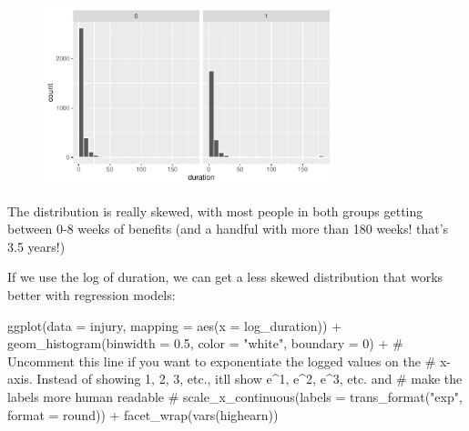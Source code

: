 \documentclass[
  letterpaper,
  DIV=11,
  numbers=noendperiod]{scrartcl}
\newenvironment{Shaded}{\begin{snugshade}}{\end{snugshade}}
\newcommand{\AttributeTok}[1]{\textcolor[rgb]{0.40,0.45,0.13}{#1}}
\newcommand{\CommentTok}[1]{\textcolor[rgb]{0.37,0.37,0.37}{#1}}
\newcommand{\DecValTok}[1]{\textcolor[rgb]{0.68,0.00,0.00}{#1}}
\newcommand{\FloatTok}[1]{\textcolor[rgb]{0.68,0.00,0.00}{#1}}
\newcommand{\FunctionTok}[1]{\textcolor[rgb]{0.28,0.35,0.67}{#1}}
\newcommand{\NormalTok}[1]{\textcolor[rgb]{0.00,0.23,0.31}{#1}}
\newcommand{\SpecialCharTok}[1]{\textcolor[rgb]{0.37,0.37,0.37}{#1}}
\newcommand{\StringTok}[1]{\textcolor[rgb]{0.13,0.47,0.30}{#1}}
\begin{document}
\begin{figure}[H]

{\centering \includegraphics[width=0.75\textwidth,height=\textheight]{DD_wooldridge_injury_files/figure-pdf/duration-histogram-1.pdf}

}

\end{figure}

The distribution is really skewed, with most people in both groups
getting between 0-8 weeks of benefits (and a handful with more than 180
weeks! that's 3.5 years!)

If we use the log of duration, we can get a less skewed distribution
that works better with regression models:

\begin{Shaded}
\begin{Highlighting}[]
\FunctionTok{ggplot}\NormalTok{(}\AttributeTok{data =}\NormalTok{ injury, }\AttributeTok{mapping =} \FunctionTok{aes}\NormalTok{(}\AttributeTok{x =}\NormalTok{ log\_duration)) }\SpecialCharTok{+}
  \FunctionTok{geom\_histogram}\NormalTok{(}\AttributeTok{binwidth =} \FloatTok{0.5}\NormalTok{, }\AttributeTok{color =} \StringTok{"white"}\NormalTok{, }\AttributeTok{boundary =} \DecValTok{0}\NormalTok{) }\SpecialCharTok{+}
  \CommentTok{\# Uncomment this line if you want to exponentiate the logged values on the}
  \CommentTok{\# x{-}axis. Instead of showing 1, 2, 3, etc., it\textquotesingle{}ll show e\^{}1, e\^{}2, e\^{}3, etc. and}
  \CommentTok{\# make the labels more human readable}
  \CommentTok{\# scale\_x\_continuous(labels = trans\_format("exp", format = round)) +}
  \FunctionTok{facet\_wrap}\NormalTok{(}\FunctionTok{vars}\NormalTok{(highearn))}
\end{Highlighting}
\end{Shaded}
\end{document}
